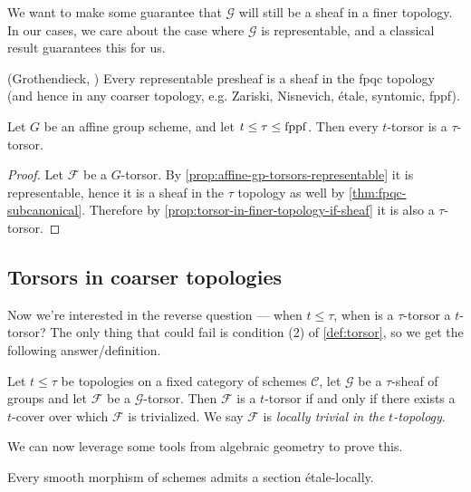 \documentclass[11pt,openany]{book}
\begin{document}
We want to make some guarantee that $\mathcal{G}$ will still be a sheaf in a finer topology. In our cases, we care about the case where $\mathcal{G}$ is representable, and a classical result guarantees this for us.

\begin{theorem}\label{thm:fpqc-subcanonical} 
(Grothendieck, \cite[023Q]{Stacks}) Every representable presheaf is a sheaf in the fpqc topology (and hence in any coarser topology, e.g. Zariski, Nisnevich, \'etale, syntomic, fppf).
\end{theorem}

\begin{corollary} Let $G$ be an affine group scheme, and let $t \le \tau \le \mathrm{fppf}$. Then every $t$-torsor is a $\tau$-torsor.
\end{corollary}
\begin{proof} Let $\mathcal{F}$ be a $G$-torsor. By \autoref{prop:affine-gp-torsors-representable} it is representable, hence it is a sheaf in the $\tau$ topology as well by \autoref{thm:fpqc-subcanonical}. Therefore by \autoref{prop:torsor-in-finer-topology-if-sheaf} it is also a $\tau$-torsor.
\end{proof}

\subsection{Torsors in coarser topologies}

Now we're interested in the reverse question --- when $t\le \tau$, when is a $\tau$-torsor a $t$-torsor? The only thing that could fail is condition (2) of \autoref{def:torsor}, so we get the following answer/definition.


\begin{definition} Let $t\le \tau$ be topologies on a fixed category of schemes $\mathscr{C}$, let $\mathcal{G}$ be a $\tau$-sheaf of groups and let $\mathcal{F}$ be a $\mathcal{G}$-torsor. Then $\mathcal{F}$ is a $t$-torsor if and only if there exists a $t$-cover over which $\mathcal{F}$ is trivialized. We say $\mathcal{F}$ is \textit{locally trivial in the} $t$\textit{-topology}.
\end{definition}

We can now leverage some tools from algebraic geometry to prove this.

\begin{proposition} Every smooth morphism of schemes admits a section \'etale-locally.
\end{proposition}
\end{document}
